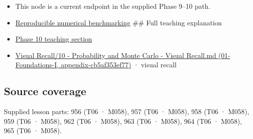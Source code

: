 \begin{itemize}
\item
  This node is a current endpoint in the supplied Phase 9--10 path.
\item
  \hyperref[appendix-b9db93e28371]{Reproducible numerical benchmarking} \#\# Full teaching explanation
\item
  \hyperref[02-foundations-ii-ch030-inference-and-error-metrics-need-explicit-assumptions]{Phase 10 teaching section}
\item
  \href{../01-Foundations-I/main.pdf\#nameddest=appendix-cb5af353ef77}{Visual Recall/10 - Probability and Monte Carlo - Visual Recall.md (01-Foundations-I, appendix-cb5af353ef77)} · visual recall
\end{itemize}

\subsection{Source coverage}\label{appendix-bcc44e9d3d02-source-coverage}

Supplied lesson parts: 956 (T06 · M058), 957 (T06 · M058), 958 (T06 · M058), 959 (T06 · M058), 962 (T06 · M058), 963 (T06 · M058), 964 (T06 · M058), 965 (T06 · M058).
